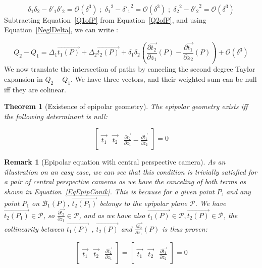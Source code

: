 \documentclass{ipol}
\newcommand{\Bund}[1]{\ensuremath{\mathcal{B}_{#1}}}
\newcommand{\BundO}{\Bund{1}}
\newcommand{\BigV}[1]{\ensuremath{\overrightarrow{#1}}}
\newcommand{\TanO}[1]{\BigV{t_1#1}}
\newcommand{\TanT}[1]{\BigV{t_2#1}}
\newcommand{\Negl}[1]{\ensuremath{\mathcal{O}(#1)}}
\newcommand{\DerPart}[2]{\frac{\partial #1}{\partial #2}}
\newtheorem{theorem}{Theorem}
\newtheorem{remark}{Remark}
\begin{document}
\begin{equation}
   \delta_1  \delta_2 -  \delta'_1  \delta'_2  = \Negl{\delta^3} \;;\;
   {\delta_1}^2 - {\delta'_1}^2 =  \Negl{\delta^3} \;;\;
   {\delta_2}^2 - {\delta'_2}^2 =  \Negl{\delta^3} 
   \label{NeglDelta}
\end{equation}
%
Subtracting Equation~\eqref{Q1ofP} from Equation~\eqref{Q2ofP}, and using Equation~\eqref{NeglDelta}, we can write :

\begin{equation}
    Q_2 -Q_1 =   \Delta_1 \TanO{(P)} +   \Delta_2 \TanT{(P)}  
               + \delta_1  \delta_2(\DerPart { \TanT{}}{z_1}(P)  -\DerPart { \TanO{}}{z_2}(P) )
               + \Negl{\delta^3}
\end{equation}
%
We now translate the intersection of paths by canceling the second degree Taylor expansion in $Q_2 -Q_1$. We have three vectors, and their weighted sum can be null iff they are colinear.

\begin{theorem}[Existence of epipolar geometry]
The epipolar geometry exists iff the following determinant is null:

\begin{equation}
\left[ \begin{array}{c|c|c}
\TanO{} & \TanT{}  & \DerPart { \TanT{}}{z_1}  -\DerPart { \TanO{}}{z_2}  
\end{array} \right]  
=0
\end{equation}

\end{theorem}

\begin{remark}[Epipolar equation with central perspective camera]
As an illustration on an easy case, we can see that this condition is trivially 
satisfied for a pair of central perspective cameras as we have the canceling of both terms as shown
in Equation~\eqref{EqEpipConik}. This is because for a given point $P$,
and any point $P_1$ on $\BundO(P)$, $\TanT{(P_1)}$ belongs to the epipolar
plane $\mathcal{P}$. We have $\TanT{(P_1)} \in \mathcal{P}$, so $\DerPart { \TanT{}}{z_1} \in \mathcal{P}$,
and as we have also $\TanO{(P)} \in  \mathcal{P}, \TanT{(P)} \in  \mathcal{P}$, the collinearity
between $\TanO{(P)}$ , $\TanT{(P)}$ and $\DerPart { \TanT{}}{z_1}(P)$ is thus proven:

\begin{equation}
\left[ \begin{array}{c|c|c}
\TanO{} & \TanT{}  & \DerPart { \TanT{}}{z_1}  
\end{array} \right]  
=\left[ \begin{array}{c|c|c}
\TanO{} & \TanT{}  & \DerPart { \TanO{}}{z_2}  
\end{array} \right]  
=0
\label{EqEpipConik}
\end{equation}
\end{remark}
\end{document}
